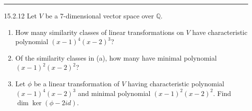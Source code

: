 \documentclass[a4paper, 12pt]{article}
\begin{document}
\noindent\rule{7in}{2.8pt}
\begin{problem}{15.2.12}
Let \(V\) be a 7-dimensional vector space over \(\mathbb{Q}\).
\begin{enumerate}[(1)]
\item How many similarity classes of linear transformations on \(V\) have characteristic polynomial \((x-1)^4(x-2)^3\)?
\item Of the similarity classes in (a), how many have minimal polynomial \((x-1)^2(x-2)^2\)?
\item Let \(\phi\) be a linear transformation of \(V\) having characteristic polynomial \((x-1)^4(x-2)^3\) and minimal polynomial 
\((x-1)^2(x-2)^2\). Find \(\dim \ker (\phi-2id)\). 
\end{enumerate}
\end{problem}
\end{document}
